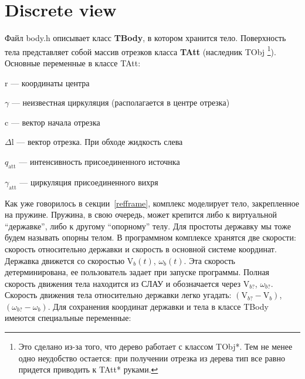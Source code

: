 \documentclass[14pt]{extreport}
\newcommand{\br}[1]{\boldsymbol{\mathrm{#1}}}
\renewcommand{\vec}[1]{\br{#1}}
\newcommand{\att}{\text{att}}
\newenvironment{packed_itemize}{
\begin{itemize}
  \setlength{\itemsep}{1pt}
  \setlength{\parskip}{0pt}
  \setlength{\parsep}{0pt}
}{\end{itemize}}
\begin{document}
\section{Discrete view}
\label{tbody}

Файл body.h описывает класс \textbf{TBody}, в котором хранится тело.
Поверхность тела представляет собой массив отрезков класса \textbf{TAtt} (наследник TObj
\footnote{Это сделано из-за того, что дерево работает с классом TObj*. Тем не менее одно неудобство остается: при получении отрезка из дерева тип все равно придется приводить к TAtt* руками.}).\\

Основные переменные в классе TAtt:
\begin{packed_itemize}
\item $\vec r$ --- координаты центра
\item $\gamma$ --- неизвестная циркуляция (располагается в центре отрезка)
\item $\vec c$ --- вектор начала отрезка
\item $\Delta \vec l$ --- вектор отрезка. При обходе жидкость слева
\item $q_\att$ --- интенсивность присоединенного источнка
\item $\gamma_\att$ --- циркуляция присоединенного вихря
\end{packed_itemize}

Как уже говорилось в секции~\ref{refframe}, комплекс моделирует тело, закрепленное на пружине. Пружина, в свою очередь, может крепится либо к виртуальной ``державке'', либо к другому ``опорному'' телу. Для простоты державку мы тоже будем называть опорны телом.
В программном комплексе хранятся две скорости: скорость относительно державки и скорость в основной системе координат. Державка движется со скоростью $\vec V_b(t)$, $\omega_b(t)$. Эта скорость детерминирована, ее пользователь задает при запуске программы. Полная скорость движения тела находится из СЛАУ и обозначается через $\vec V_{b?}$, $\omega_{b?}$. Скорость движения тела относительно державки легко угадать: $(\vec V_{b?} - \vec V_b)$, $(\omega_{b?} - \omega_b)$. Для сохранения координат державки и тела в классе TBody имеются специальные переменные: 
\end{document}
